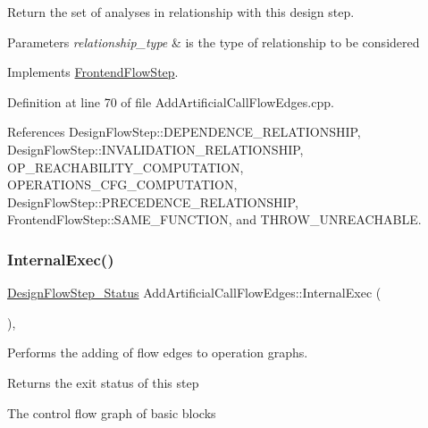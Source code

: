 Return the set of analyses in relationship with this design step. 


\begin{DoxyParams}{Parameters}
{\em relationship\+\_\+type} & is the type of relationship to be considered \\
\hline
\end{DoxyParams}


Implements \hyperlink{classFrontendFlowStep_abeaff70b59734e462d347ed343dd700d}{Frontend\+Flow\+Step}.



Definition at line 70 of file Add\+Artificial\+Call\+Flow\+Edges.\+cpp.



References Design\+Flow\+Step\+::\+D\+E\+P\+E\+N\+D\+E\+N\+C\+E\+\_\+\+R\+E\+L\+A\+T\+I\+O\+N\+S\+H\+IP, Design\+Flow\+Step\+::\+I\+N\+V\+A\+L\+I\+D\+A\+T\+I\+O\+N\+\_\+\+R\+E\+L\+A\+T\+I\+O\+N\+S\+H\+IP, O\+P\+\_\+\+R\+E\+A\+C\+H\+A\+B\+I\+L\+I\+T\+Y\+\_\+\+C\+O\+M\+P\+U\+T\+A\+T\+I\+ON, O\+P\+E\+R\+A\+T\+I\+O\+N\+S\+\_\+\+C\+F\+G\+\_\+\+C\+O\+M\+P\+U\+T\+A\+T\+I\+ON, Design\+Flow\+Step\+::\+P\+R\+E\+C\+E\+D\+E\+N\+C\+E\+\_\+\+R\+E\+L\+A\+T\+I\+O\+N\+S\+H\+IP, Frontend\+Flow\+Step\+::\+S\+A\+M\+E\+\_\+\+F\+U\+N\+C\+T\+I\+ON, and T\+H\+R\+O\+W\+\_\+\+U\+N\+R\+E\+A\+C\+H\+A\+B\+LE.

\mbox{\label{classAddArtificialCallFlowEdges_af8c77aa64aec79e8f541b6c9d681f786}} 
\subsubsection{\texorpdfstring{Internal\+Exec()}{InternalExec()}}
{\footnotesize\ttfamily \hyperlink{design__flow__step_8hpp_afb1f0d73069c26076b8d31dbc8ebecdf}{Design\+Flow\+Step\+\_\+\+Status} Add\+Artificial\+Call\+Flow\+Edges\+::\+Internal\+Exec (\begin{DoxyParamCaption}{ }\end{DoxyParamCaption})\hspace{0.3cm}{\ttfamily [override]}, {\ttfamily [virtual]}}



Performs the adding of flow edges to operation graphs. 

\begin{DoxyReturn}{Returns}
the exit status of this step 
\end{DoxyReturn}
The control flow graph of basic blocks

